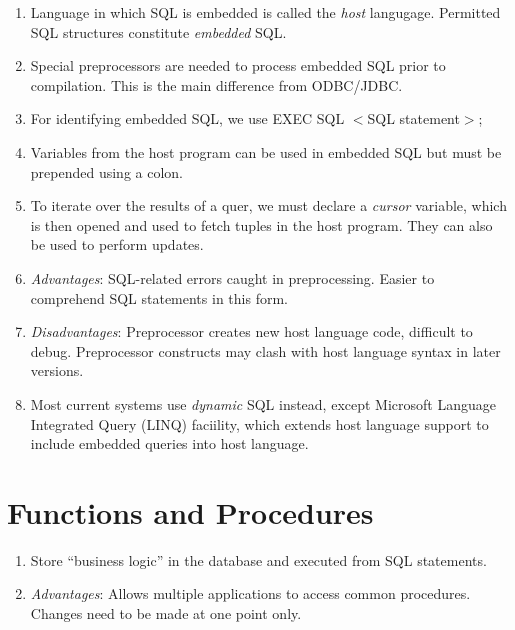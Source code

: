 \documentclass[journal,12pt,twocolumn]{IEEEtran}
\begin{document}
\begin{enumerate}
     \item Language in which SQL is embedded is called the \textit{host}
     langugage. Permitted SQL structures constitute \textit{embedded} SQL.
     \item Special preprocessors are needed to process embedded SQL prior to 
     compilation. This is the main difference from ODBC/JDBC.
     \item For identifying embedded SQL, we use EXEC SQL $<$SQL statement$>$;
     \item Variables from the host program can be used in embedded SQL but 
     must be prepended using a colon.
     \item To iterate over the results of a quer, we must declare a 
     \textit{cursor} variable, which is then opened and used to fetch tuples
     in the host program. They can also be used to perform updates.
     \item \textit{Advantages}: SQL-related errors caught in preprocessing.
     Easier to comprehend SQL statements in this form.
     \item \textit{Disadvantages}: Preprocessor creates new host language code,
     difficult to debug. Preprocessor constructs may clash with host language
     syntax in later versions.
     \item Most current systems use \textit{dynamic} SQL instead, except
     Microsoft Language Integrated Query (LINQ) faciility, which extends host 
     language support to include embedded queries into host language. 
\end{enumerate}

\section{Functions and Procedures}

\begin{enumerate}
     \item Store ``business logic'' in the database and executed from SQL 
     statements.
     \item \textit{Advantages}: Allows multiple applications to access common 
     procedures. Changes need to be made at one point only.
\end{enumerate}
\end{document}
